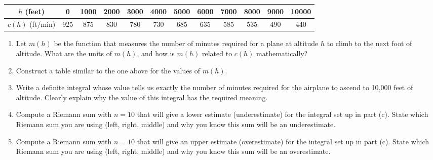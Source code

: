\documentclass[11pt,letterpaper]{article}
\begin{document}
\begin{center}
	\begin{tabular}{c||c|c|c|c|c|c|c|c|c|c|c}
	$h$ (feet) & 0 & 1000 & 2000 & 3000 & 4000 & 5000 & 6000 & 7000 & 8000 & 9000 & 10000 \\ \hline
	$c(h)$ (ft/min) & 925 & 875 & 830 & 780 & 730 & 685 & 635 & 585 & 535 & 490 & 440 
	\end{tabular}
\end{center}

	\begin{enumerate}
	    \item Let $m(h)$ be the function that measures the number of  minutes required for a plane at altitude $h$ to climb to the next foot of altitude. What are the units of $m(h)$, and how is $m(h)$ related to $c(h)$ mathematically? 
		\item Construct a table similar to the one above for the values of $m(h)$.
		\item Write a definite integral whose value tells us exactly the number of minutes required for the airplane to ascend to 10,000 feet of altitude. Clearly explain why the value of this integral has the required meaning.
		\item Compute a Riemann sum with $n = 10$ that will give a lower estimate (underestimate) for the integral set up in part (c). State which Riemann sum you are using (left, right, middle) and why you know this sum will be an underestimate.
		\item Compute a Riemann sum with $n = 10$ that will give an upper  estimate (overestimate) for the integral set up in part (c). State which Riemann sum you are using (left, right, middle) and why you know this sum will be an overestimate.
	\end{enumerate}
\end{document}
